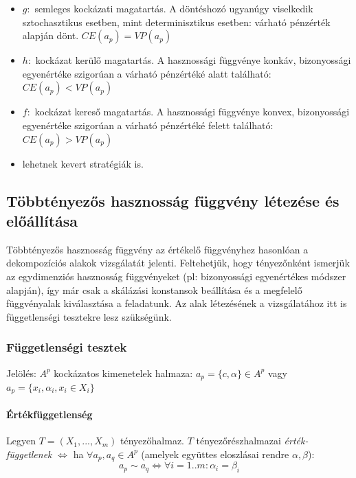 \documentclass[a4paper,12pt]{article}
\begin{document}
\begin{itemize}
\item $g:$ semleges kockázati magatartás. A döntéshozó ugyanúgy viselkedik sztochasztikus esetben, mint determinisztikus esetben: várható pénzérték alapján dönt. $CE(a_p) = VP(a_p)$
\item $h:$ kockázat kerülő magatartás. A hasznossági függvénye konkáv, bizonyossági egyenértéke szigorúan a várható pénzértéké alatt található: $CE(a_p) < VP(a_p)$
\item $f:$ kockázat kereső magatartás. A hasznossági függvénye konvex, bizonyossági egyenértéke szigorúan a várható pénzértéké felett található: $CE(a_p) > VP(a_p)$
\item lehetnek kevert stratégiák is.
\end{itemize}

\subsection{Többtényezős hasznosság függvény létezése és előállítása}

Többtényezős hasznosság függvény az értékelő függvényhez hasonlóan a dekompozíciós alakok vizsgálatát jelenti. Feltehetjük, hogy tényezőnként ismerjük az egydimenziós hasznosság függvényeket (pl: bizonyossági egyenértékes módszer alapján), így már csak a skálázási konstansok beállítása és a megfelelő függvényalak kiválasztása a feladatunk. Az alak létezésének a vizsgálatához itt is függetlenségi tesztekre lesz szükségünk.

\subsubsection{Függetlenségi tesztek}

Jelölés: $A^p$ kockázatos kimenetelek halmaza:  $a_p=\{c, \alpha\} \in A^p  $ vagy $a_{p} = \{x_i, \alpha_i, x_i \in X_i\}$

\paragraph{Értékfüggetlenség}

Legyen $T=(X_1,...,X_m)$ tényezőhalmaz. $T$ tényezőrészhalmazai \textit{érték-függetlenek} $\Leftrightarrow$ ha $\forall a_p, a_q \in A^p$ (amelyek együttes eloszlásai rendre $\alpha,\beta$): 
\begin{equation}
 a_p \sim a_q \Leftrightarrow \forall i=1..m: \alpha_i=\beta_i
\end{equation}
\end{document}
